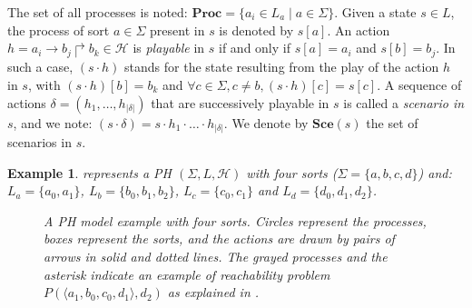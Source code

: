 \documentclass{movep}
\makeatletter
\def\pref{\prettyref}
\newtheorem*{example*}{Example}{\itshape}{}
\newcommand{\PHs}{\Sigma}
\newcommand{\PHl}{L}
\newcommand{\Proc}{\mathbf{Proc}}
\newcommand{\PHa}{\PHh}
\newcommand{\PHh}{\mathcal{H}}
\def\play{\cdot}
\newcommand{\card}[1]{{|#1|}}
\newcommand{\PHfrappeA}{\rightarrow}
\newcommand{\PHfrappeB}{\Rsh}
\newcommand{\PHfrappe}[3]{#1\PHfrappeA#2\PHfrappeB#3}
\def\Sce{\mathbf{Sce}}
\def\PHget#1#2{{#1[#2]}}
\newcommand{\PHetat}[1]{\mbox{$\langle #1 \rangle$}}
\newcommand{\currentScope}{}
\newcommand{\currentSort}{}
\newcommand{\currentSortLabel}{}
\newcommand{\currentAlign}{}
\newcommand{\currentSize}{}
\newcounter{la}
\newcommand{\TSort}[4]{
  \renewcommand{\currentScope}{#1}
  \renewcommand{\currentSort}{#2}
  \renewcommand{\currentSize}{#3}
  \renewcommand{\currentAlign}{#4}
  \ifcsname TUserSort@\currentSort\endcsname
    \renewcommand{\currentSortLabel}{\csname TUserSort@\currentSort\endcsname}
  \else
    \renewcommand{\currentSortLabel}{\currentSort}
  \fi
  \begin{scope}[shift={\currentScope}]
  \ifthenelse{\equal{\currentAlign}{l}}{
    \filldraw[process box] (-0.5,-0.5) rectangle (0.5,\currentSize-0.5);
    \node[sort] at (-0.2,\currentSize-0.4) {\currentSortLabel};
   }{\ifthenelse{\equal{\currentAlign}{r}}{
     \filldraw[process box] (-0.5,-0.5) rectangle (0.5,\currentSize-0.5);
     \node[sort] at (0.2,\currentSize-0.4) {\currentSortLabel};
   }{
    \filldraw[process box] (-0.5,-0.5) rectangle (\currentSize-0.5,0.5);
    \ifthenelse{\equal{\currentAlign}{t}}{
      \node[sort,anchor=east] at (-0.3,0.2) {\currentSortLabel};
    }{
      \node[sort] at (-0.6,-0.2) {\currentSortLabel};
    }
   }}
  \setcounter{la}{\currentSize}
  \addtocounter{la}{-1}
  \foreach \i in {0,...,\value{la}} {
    \TProc{\i}
  }
  \end{scope}
}
\newcommand{\TTickProc}[2]{ %
  \ifthenelse{\equal{\currentAlign}{l}}{
    \draw[tick] (-0.6,#1) -- (-0.4,#1);
    \node[tick label, anchor=east] at (-0.55,#1) {#2};
   }{\ifthenelse{\equal{\currentAlign}{r}}{
    \draw[tick] (0.6,#1) -- (0.4,#1);
    \node[tick label, anchor=west] at (0.55,#1) {#2};
   }{
    \ifthenelse{\equal{\currentAlign}{t}}{
      \draw[tick] (#1,0.6) -- (#1,0.4);
      \node[tick label, anchor=south] at (#1,0.55) {#2};
    }{
      \draw[tick] (#1,-0.6) -- (#1,-0.4);
      \node[tick label, anchor=north] at (#1,-0.55) {#2};
    }
   }}
}
\newcommand{\myProc}[3]{
  \ifcsname TUserTick@\currentSort_#1\endcsname
    \TTickProc{#1}{\csname TUserTick@\currentSort_#1\endcsname}
  \else
    \TTickProc{#1}{#1}
  \fi
  \ifthenelse{\equal{\currentAlign}{l}\or\equal{\currentAlign}{r}}{
    \node[#2] (\currentSort_#1) at (0,#1) {#3};
  }{
    \node[#2] (\currentSort_#1) at (#1,0) {#3};
  }
}
\newcommand{\TProc}[1]{
  \ifcsname TUserProcStyle@\currentSort_#1\endcsname
    \myProc{#1}{\csname TUserProcStyle@\currentSort_#1\endcsname}{}
  \else
    \myProc{#1}{process}{}
  \fi
}
\newcommand{\repcommand}[2]{
  \providecommand{#1}{#2}
  \renewcommand{#1}{#2}
}
\newcommand{\THit}[5]{
  \path[hit] (#1) edge[#2] (#3#4);
  \expandafter\repcommand\expandafter{\csname TBounce@#3@#5\endcsname}{#4}
}
\newcommand{\TBounce}[4]{
  (#1\csname TBounce@#1@#3\endcsname) edge[#2] (#3#4)
}
\newcommand{\TState}[1]{
  \foreach \proc in {#1} {
    \node[current process] (\proc) at (\proc.center) {};
  }
}
\makeatother
\begin{document}
\noindent
The set of all processes is noted: $\Proc = \{ a_i \in \PHl_a \mid a \in \PHs \}$.
Given a state $s\in \PHl$, the process of sort $a\in\PHs$ present in $s$ is denoted by $\PHget{s}{a}$.
An action $h=\PHfrappe{a_i}{b_j}{b_k} \in \PHa$ is \emph{playable} in $s$ if and only if
$\PHget{s}{a}=a_i$ and $\PHget{s}{b} = b_j$.
In such a case, $(s\play h)$ stands for the state resulting from the play of the action
$h$ in $s$, with $\PHget{(s\play h)}{b} = b_k$ and
$\forall c \in \PHs, c \neq b, \PHget{(s\play h)}{c} = \PHget{s}{c}$.
A sequence of actions $\delta = (h_1, \ldots, h_\card{\delta})$ that are successively playable in $s$
is called a \emph{scenario in $s$}, and we note:
$(s \play \delta) = s \play h_1 \play \ldots \play h_\card{\delta}$.
We denote by $\Sce(s)$ the set of scenarios in $s$.

\begin{example*}
\pref{fig:ph} represents a PH $(\PHs,\PHl,\PHa)$ with four sorts
($\PHs = \{a, b, c, d\}$) and:
$\PHl_a = \{a_0, a_1\}$,
$\PHl_b = \{b_0, b_1, b_2\}$,
$\PHl_c = \{c_0, c_1\}$ and
$\PHl_{d} = \{d_0, d_1, d_2\}$.

\begin{figure}[ht]
\centering
{}
\caption{\label{fig:ph}
A PH model example with four sorts.
Circles represent the processes, boxes represent the sorts,
and the actions are drawn by pairs of arrows in solid and dotted lines.
The grayed processes and the asterisk indicate
an example of reachability problem $P(\PHetat{a_1,b_0,c_0,d_1}, d_2)$
as explained in \pref{sec:reachability}.
}
\end{figure}
\end{example*}
\end{document}
